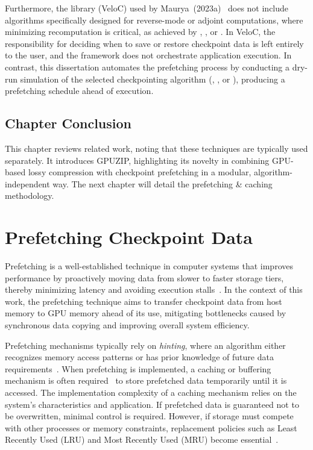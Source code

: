 \documentclass[Ingles,Final]{ic-tese-v3}
\begin{document}
Furthermore, the \checkpointing library (VeloC) used by Maurya~\etal (2023a)~\cite{maurya2023} does not include algorithms specifically designed for reverse-mode or adjoint computations, where minimizing recomputation is critical, as achieved by \revolve, \zcut, or \uniform. In VeloC, the responsibility for deciding when to save or restore checkpoint data is left entirely to the user, and the framework does not orchestrate application execution. In contrast, this dissertation automates the prefetching process by conducting a dry-run simulation of the selected checkpointing algorithm (\revolve, \zcut, or \uniform), producing a prefetching schedule ahead of execution.



\section{Chapter Conclusion}
This chapter reviews related work, noting that these techniques are typically used separately. It introduces GPUZIP, highlighting its novelty in combining GPU-based lossy compression with checkpoint prefetching in a modular, algorithm-independent way. The next chapter will detail the prefetching \& caching methodology.


\chapter{Prefetching Checkpoint Data}
\label{ch:prefetch}

Prefetching is a well-established technique in computer systems that improves performance by proactively moving data from slower to faster storage tiers, thereby minimizing latency and avoiding execution stalls~\cite{mittal2017,vanderwiel2000}. In the context of this work, the prefetching technique aims to transfer checkpoint data from host memory to GPU memory ahead of its use, mitigating bottlenecks caused by synchronous data copying and improving overall system efficiency.

Prefetching mechanisms typically rely on \textit{hinting}, where an algorithm either recognizes memory access patterns or has prior knowledge of future data requirements~\cite{patterson1995, maurya2023}. When prefetching is implemented, a caching or buffering mechanism is often required~\cite{patterson1995, butt2007, maurya2023} to store prefetched data temporarily until it is accessed. The implementation complexity of a caching mechanism relies on the system's characteristics and application. If prefetched data is guaranteed not to be overwritten, minimal control is required. However, if storage must compete with other processes or memory constraints, replacement policies such as Least Recently Used (LRU) and Most Recently Used (MRU) become essential~\cite{butt2007, carr1981}.
\end{document}
